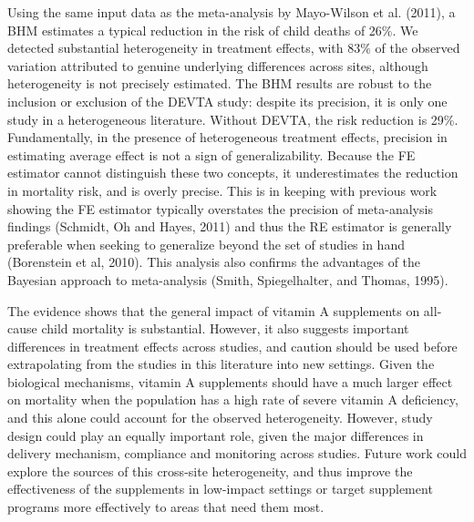 \documentclass[12pt]{article}
\begin{document}
Using the same input data as the meta-analysis by Mayo-Wilson et al. (2011), a BHM estimates a typical reduction in the risk of child deaths of 26\%. 
We detected substantial heterogeneity in treatment effects, with 83\% of the observed variation attributed to genuine underlying differences across sites, although heterogeneity is not precisely estimated. The BHM results are robust to the inclusion or exclusion of the DEVTA study: despite its precision, it is only one study in a heterogeneous literature. Without DEVTA, the risk reduction is 29\%. 
Fundamentally, in the presence of heterogeneous treatment effects, precision in estimating average effect is not a sign of generalizability. 
Because the FE estimator cannot distinguish these two concepts, it underestimates the reduction in mortality risk, and is overly precise. 
This is in keeping with previous work showing the FE estimator typically overstates the precision of meta-analysis findings (Schmidt, Oh and Hayes, 2011) and thus the RE estimator is generally preferable when seeking to generalize beyond the set of studies in hand (Borenstein et al, 2010). 
This analysis also confirms the advantages of the Bayesian approach to meta-analysis (Smith, Spiegelhalter, and Thomas, 1995).

The evidence shows that the general impact of vitamin A supplements on all-cause child mortality is substantial. However, it also suggests important differences in treatment effects across studies, and caution should be used before extrapolating from the studies in this literature into new settings. Given the biological mechanisms, vitamin A supplements should have a much larger effect on mortality when the population has a high rate of severe vitamin A deficiency, and this alone could account for the observed heterogeneity. However, study design could play an equally important role, given the major differences in delivery mechanism, compliance and monitoring across studies. Future work could explore the sources of this cross-site heterogeneity, and thus improve the effectiveness of the supplements in low-impact settings or target supplement programs more effectively to areas that need them most.

\clearpage
\end{document}
